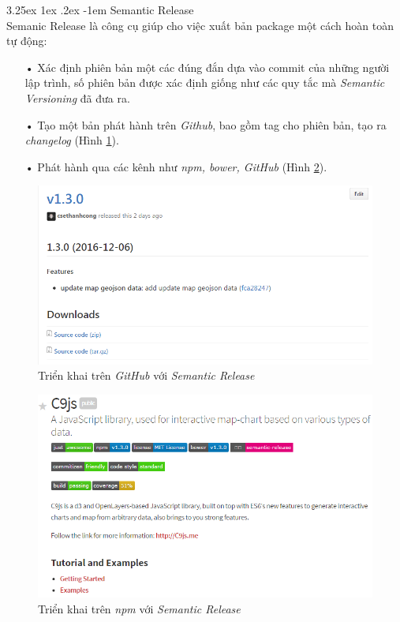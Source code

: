 \documentclass[12pt,a4paper,twoside]{article}
\makeatletter
\newcommand{\myparagraph}[1]{\paragraph{#1}\mbox{}\\} %
\renewcommand\paragraph{\@startsection{paragraph}{5}{\z@}%
  {3.25ex \@plus1ex \@minus.2ex}%
  {-1em}%
  {\normalfont\normalsize\bfseries}}
\makeatother
\begin{document}
\myparagraph{Semantic Release}
Semanic Release là công cụ giúp cho việc xuất bản package một cách hoàn toàn tự động:
\begin{itemize}
\item[•] Xác định phiên bản một các đúng đắn dựa vào commit của những người lập trình, số phiên bản được xác định giống như các quy tắc mà \textit{Semantic Versioning} đã đưa ra.
\item[•] Tạo một bản phát hành trên \textit{Github}, bao gồm tag cho phiên bản, tạo ra \textit{changelog} (Hình \ref{fig:semantic_1}).
\item[•] Phát hành qua các kênh như \textit{npm, bower, GitHub} (Hình \ref{fig:semantic_2}).
\end{itemize}

\begin{figure}[!h]
	\begin{center}
    \includegraphics[scale=.8]{image/semantic_1}
    \caption{Triển khai trên \textit{GitHub} với \textit{Semantic Release}}
    \label{fig:semantic_1}
	\end{center}
\end{figure}

\begin{figure}[!h]
	\begin{center}
    \includegraphics[scale=.8]{image/semantic_2}
    \caption{Triển khai trên \textit{npm} với \textit{Semantic Release}}
    \label{fig:semantic_2}
	\end{center}
\end{figure}
\end{document}
